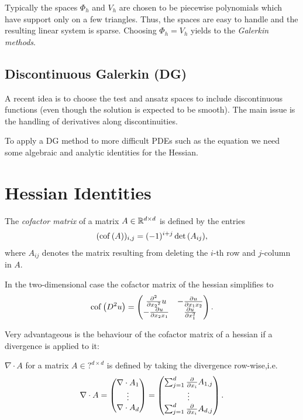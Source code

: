 Typically the spaces $\Phi_h$ and $V_h$ are chosen to be piecewise polynomials which have support only on a few triangles. Thus, the spaces are easy to handle and the resulting linear system is sparse.
Choosing $\Phi_h = V_h$ yields to the \emph{Galerkin methods}.

\subsection{Discontinuous Galerkin (DG)}
A recent idea is to choose the test and ansatz spaces to include discontinuous functions (even though the solution is expected to be smooth).
The main issue is the handling of derivatives along discontinuities.

\todo{ Kommentar zur Implementation wegen Vorzeichen für Kantenterme]}
\newpage

To apply a DG method to more difficult PDEs such as the \MA equation we need some algebraic and analytic identities for the Hessian.
\section{Hessian Identities}

\begin{definition} \label{def: cof matrix}
	The \emph{cofactor matrix} of a matrix $A \in \mathbb{R}^{d \times d}$ is defined by the entries
	\begin{align}
	(\operatorname{cof} \left( A \right) )_{i,j} = (-1)^{i+j} \det{\left(A_{ij}\right)},
	\end{align}
	where $A_{ij}$ denotes the matrix resulting from deleting the $i$-th row and $j$-column in $A$.
\end{definition}

In the two-dimensional case the cofactor matrix of the hessian simplifies to
\begin{align}
\operatorname{cof} \left( D^2 u \right) = \begin{pmatrix}
								\frac {\partial^2} {\partial {x_2}^2} u & -\frac {\partial u}{\partial x_1 x_2} \\
								-\frac {\partial u}{\partial x_2 x_1} & \frac {\partial u}{\partial x_1^2} 
							\end{pmatrix}.
\end{align}


Very advantageous is the behaviour of the cofactor matrix of a hessian if a divergence is applied to it:
\begin{definition}
	$\nabla \cdot A$ for a matrix $A \in ?^{d \times d}$ is defined by taking the divergence row-wise,i.e.
\[
	\nabla \cdot A = \begin{pmatrix} \nabla \cdot A_1 \\ \vdots \\ \nabla \cdot A_d\end{pmatrix}
	= \begin{pmatrix} \sum_{j = 1}^{d} \frac \partial {\partial x_i} A_{1,j} \\ \vdots \\ \sum_{j = 1}^{d} \frac \partial {\partial x_i} A_{d,j}\end{pmatrix}.
\]
	
\end{definition}

